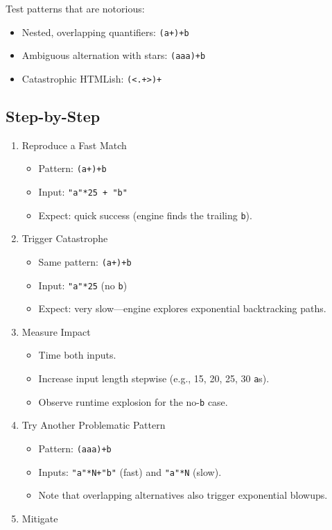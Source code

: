 \documentclass[
  letterpaper,
  DIV=11,
  numbers=noendperiod]{scrreprt}
\providecommand{\tightlist}{%
  \setlength{\itemsep}{0pt}\setlength{\parskip}{0pt}}
\begin{document}
Test patterns that are notorious:

\begin{itemize}
\tightlist
\item
  Nested, overlapping quantifiers: \texttt{(a+)+b}
\item
  Ambiguous alternation with stars: \texttt{(a\textbar{}aa)+b}
\item
  Catastrophic HTMLish: \texttt{(\textless{}.+\textgreater{})+}
\end{itemize}

\subsection{Step-by-Step}\label{step-by-step-10}

\begin{enumerate}
\def\labelenumi{\arabic{enumi}.}
\item
  Reproduce a Fast Match

  \begin{itemize}
  \tightlist
  \item
    Pattern: \texttt{(a+)+b}
  \item
    Input: \texttt{"a"*25\ +\ "b"}
  \item
    Expect: quick success (engine finds the trailing \texttt{b}).
  \end{itemize}
\item
  Trigger Catastrophe

  \begin{itemize}
  \tightlist
  \item
    Same pattern: \texttt{(a+)+b}
  \item
    Input: \texttt{"a"*25} (no \texttt{b})
  \item
    Expect: very slow---engine explores exponential backtracking paths.
  \end{itemize}
\item
  Measure Impact

  \begin{itemize}
  \tightlist
  \item
    Time both inputs.
  \item
    Increase input length stepwise (e.g., 15, 20, 25, 30 \texttt{a}s).
  \item
    Observe runtime explosion for the no-\texttt{b} case.
  \end{itemize}
\item
  Try Another Problematic Pattern

  \begin{itemize}
  \tightlist
  \item
    Pattern: \texttt{(a\textbar{}aa)+b}
  \item
    Inputs: \texttt{"a"*N+"b"} (fast) and \texttt{"a"*N} (slow).
  \item
    Note that overlapping alternatives also trigger exponential blowups.
  \end{itemize}
\item
  Mitigate


\end{enumerate}
\end{document}
